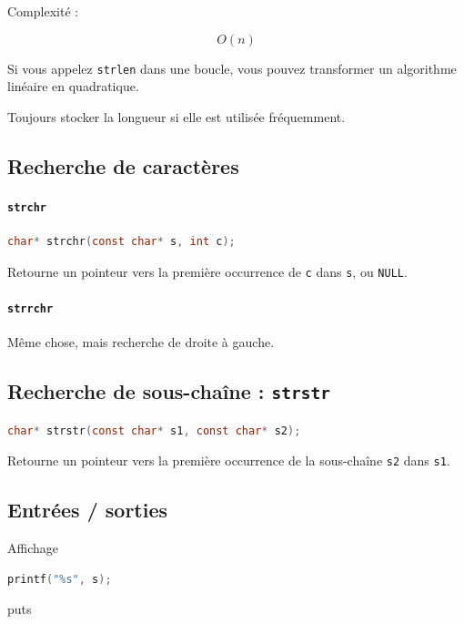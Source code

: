 Complexité :

\[
\boxed{O(n)}
\]

Si vous appelez \texttt{strlen} dans une boucle,
vous pouvez transformer un algorithme linéaire en quadratique.

Toujours stocker la longueur si elle est utilisée fréquemment.

\subsection{Recherche de caractères}

\paragraph{\texttt{strchr}}

\begin{lstlisting}[language=C]
char* strchr(const char* s, int c);
\end{lstlisting}

Retourne un pointeur vers la première occurrence de \texttt{c}
dans \texttt{s}, ou \texttt{NULL}.

\paragraph{\texttt{strrchr}}

Même chose, mais recherche de droite à gauche.

\subsection{Recherche de sous-chaîne : \texttt{strstr}}

\begin{lstlisting}[language=C]
char* strstr(const char* s1, const char* s2);
\end{lstlisting}

Retourne un pointeur vers la première occurrence de
la sous-chaîne \texttt{s2} dans \texttt{s1}.

\subsection{Entrées / sorties}

Affichage

\begin{lstlisting}[language=C]
printf("%s", s);
\end{lstlisting}

puts

